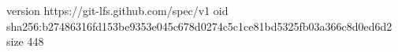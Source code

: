version https://git-lfs.github.com/spec/v1
oid sha256:b27486316fd153be9353e045c678d0274c5c1ce81bd5325fb03a366c8d0ed6d2
size 448
